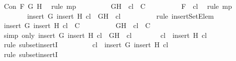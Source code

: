 \begin{isabellebody}
\ {\isacartoucheopen}Con\ F\ G\ H{\isacartoucheclose}\ \isamarkupfalse%
\ {\isacharparenleft}rule\ mp{\isacharparenright}\isanewline
\ \ \ \ \ \ \isamarkupfalse%
\ \isamarkupfalse%
\ {\isachardoublequoteopen}{\isacharbraceleft}G{\isacharcomma}H{\isacharbraceright}\ {\isasymunion}\ {\isacharquery}cl\ {\isasymin}\ C{\isachardoublequoteclose}\isanewline
\ \ \ \ \ \ \ \ \isamarkupfalse%
\ {\isacartoucheopen}F\ {\isasymin}\ {\isacharquery}cl{\isacartoucheclose}\ \isamarkupfalse%
\ {\isacharparenleft}rule\ mp{\isacharparenright}\isanewline
\ \ \ \ \ \ \isamarkupfalse%
\ {\isachardoublequoteopen}{\isacharparenleft}insert\ G\ {\isacharparenleft}insert\ H\ {\isacharquery}cl{\isacharparenright}{\isacharparenright}\ {\isacharequal}\ {\isacharbraceleft}G{\isacharcomma}H{\isacharbraceright}\ {\isasymunion}\ {\isacharquery}cl{\isachardoublequoteclose}\isanewline
\ \ \ \ \ \ \ \ \isamarkupfalse%
\ {\isacharparenleft}rule\ insertSetElem{\isacharparenright}\isanewline
\ \ \ \ \ \ \isamarkupfalse%
\ \isamarkupfalse%
\ {\isachardoublequoteopen}{\isacharparenleft}insert\ G\ {\isacharparenleft}insert\ H\ {\isacharquery}cl{\isacharparenright}{\isacharparenright}\ {\isasymin}\ C{\isachardoublequoteclose}\isanewline
\ \ \ \ \ \ \ \ \isamarkupfalse%
\ {\isacartoucheopen}{\isacharbraceleft}G{\isacharcomma}H{\isacharbraceright}\ {\isasymunion}\ {\isacharquery}cl\ {\isasymin}\ C{\isacartoucheclose}\ \isamarkupfalse%
\ {\isacharparenleft}simp\ only{\isacharcolon}\ {\isacartoucheopen}{\isacharparenleft}insert\ G\ {\isacharparenleft}insert\ H\ {\isacharquery}cl{\isacharparenright}{\isacharparenright}\ {\isacharequal}\ {\isacharbraceleft}G{\isacharcomma}H{\isacharbraceright}\ {\isasymunion}\ {\isacharquery}cl{\isacartoucheclose}{\isacharparenright}\isanewline
\ \ \ \ \ \ \isamarkupfalse%
\ {\isachardoublequoteopen}{\isacharquery}cl\ {\isasymsubseteq}\ insert\ H\ {\isacharquery}cl{\isachardoublequoteclose}\isanewline
\ \ \ \ \ \ \ \ \isamarkupfalse%
\ {\isacharparenleft}rule\ subset{\isacharunderscore}insertI{\isacharparenright}\isanewline
\ \ \ \ \ \ \isamarkupfalse%
\ \isamarkupfalse%
\ {\isachardoublequoteopen}{\isacharquery}cl\ {\isasymsubseteq}\ insert\ G\ {\isacharparenleft}insert\ H\ {\isacharquery}cl{\isacharparenright}{\isachardoublequoteclose}\isanewline
\ \ \ \ \ \ \ \ \isamarkupfalse%
\ {\isacharparenleft}rule\ subset{\isacharunderscore}insertI{}{\isacharparenright}\isanewline

\end{isabellebody}
